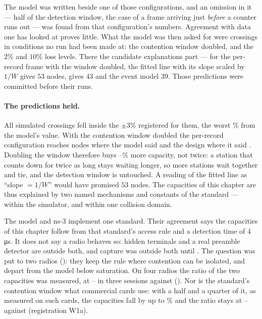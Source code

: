 \begin{remark}
The model was written beside one of those configurations, and an omission in it --- half of the
detection window, the case of a frame arriving just \emph{before} a counter runs out --- was
found from that configuration's numbers. Agreement with data one has looked at proves little.
What the model was then asked for were crossings in conditions no run had been made at: the
contention window doubled, and the $2\%$ and $10\%$ loss levels. There the candidate
explanations part --- for the per-record frame with the window doubled, the fitted line with its
slope scaled by $1/W$ gives $53$ nodes,  gives $43$ and the event model $39$.
Those predictions were committed before their runs.
\end{remark}

\paragraph{The predictions held.} All \modelPredCases{} simulated crossings fell inside the
$\pm 3\%$ registered for them, the worst \modelPredWorst\% from the model's value. With the
contention window doubled the per-record configuration reaches \modelNsWindowC{} nodes
where the model said \modelPredWindowC{} and the design \modelNsWindowD{} where it said
\modelPredWindowD. Doubling the window therefore buys \modelGainC--\modelGainD\% more
capacity, not twice: a station that counts down for twice as long stays waiting longer, so more stations wait
together and tie, and the detection window is untouched. A reading of the fitted line as
``slope $= 1/W$'' would have promised $53$ nodes. The capacities of this chapter are thus
explained by two named mechanisms and constants of the standard --- within the simulator, and
within one collision domain.

\begin{remark}
The model and ns-3 implement one standard. Their agreement says the capacities of this chapter
follow from that standard's access rule and a detection time of $4$\,\si{\micro\second}. It
does not say a radio behaves so: hidden terminals and a real preamble detector are outside
both, and capture was outside both until . The question was put to two radios
(): they keep the rule where contention can be isolated, and depart from the
model below saturation. On four radios the ratio of the two capacities was measured, at
\hwRatioLo--\hwRatioHi{} in three sessions against \hwModelRatio{} (). Nor is the standard's contention window what
commercial cards use: with a half and a quarter of it, as measured on such cards, the capacities
fall by up to \winFall\% and the ratio stays at \winRatioQuarter--\winRatioHalf{} against
\winRatioStd{} (registration W1a).
\end{remark}

